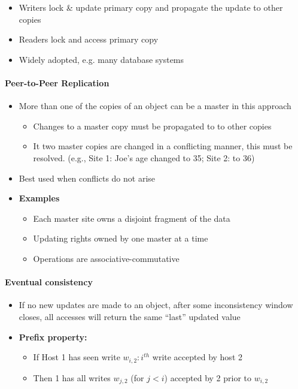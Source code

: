 \begin{itemize}
\item Writers lock \& update primary copy and propagate the
  update to other copies
\item Readers lock and access primary copy
\item Widely adopted, e.g. many database systems
\end{itemize}


\paragraph{Peer-to-Peer Replication}
\begin{itemize}
\item More than one of the copies of an object can be a master in
  this approach
  \begin{itemize}
  \item Changes to a master copy must be propagated to to other copies
  \item It two master copies are changed in a conflicting
    manner, this must be resolved. (e.g., Site 1: Joe's
    age changed to 35; Site 2: to 36)
  \end{itemize}
\end{itemize}

\begin{itemize}
\item Best used when conflicts do not arise
\item \textbf{Examples}
  \begin{itemize}
  \item Each master site owns a disjoint fragment of the data
  \item Updating rights owned by one master at a time
  \item Operations are associative-commutative
  \end{itemize}
\end{itemize}

\paragraph{Eventual consistency}
\begin{itemize}
\item If no new updates are made to an object, after some
  inconsistency window closes, all accesses will return the
  same ``last'' updated value
\end{itemize}

\begin{itemize}
\item \textbf{Prefix property:}
  \begin{itemize}
  \item If Host 1 has seen write $w_{i,2}: i^{th}$ write accepted
    by host 2
  \item Then 1 has all writes $w_{j,2}$ (for $j < i$) accepted
    by 2 prior to $w_{i,2}$
  \end{itemize}
\end{itemize}


